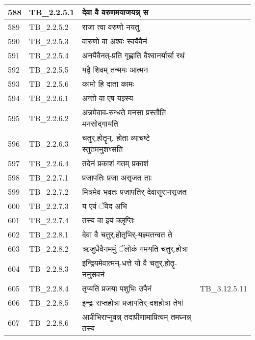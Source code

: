 \documentclass[17pt]{extarticle}
\begin{document}
\begin{longtable}{||p{0.4in}||p{0.9in}||p{4.0in}||p{0.9in}||}
        \hline
            588 & TB\_2.2.5.1 & देवा वै वरुणमयाजयन्न् स &      \\
        \hline
            589 & TB\_2.2.5.2 & राजा त्वा वरुणो नयतु &      \\
        \hline
            590 & TB\_2.2.5.3 & वारुणो वा अश्वः स्वयैवैनं &      \\
        \hline
            591 & TB\_2.2.5.4 & अनयैवैनत्{-}प्रति गृह्णाति वैश्वानर्यार्चा रथं &      \\
        \hline
            592 & TB\_2.2.5.5 & यद्वै शिवम् तन्मयः आत्मन &      \\
        \hline
            593 & TB\_2.2.5.6 & कामो हि दाता कामः &      \\
        \hline
            594 & TB\_2.2.6.1 & अन्तो वा एष यज्ञ्स्य &      \\
        \hline
            595 & TB\_2.2.6.2 & अन्नमेवाव{-}रुन्धते मनसा प्रस्तौति मनसोद्गायति &      \\
        \hline
            596 & TB\_2.2.6.3 & चतुर्.होतॄन्. होता व्याचष्टे स्तुतमनुशꣳसति &      \\
        \hline
            597 & TB\_2.2.6.4 & तदेनं प्रकाशं गतम् प्रकाशं &      \\
        \hline
            598 & TB\_2.2.7.1 & प्रजापतिः प्रजा असृजत ताः &      \\
        \hline
            599 & TB\_2.2.7.2 & मित्रमेव भवतः प्रजापतिर् देवासुरानसृजत &      \\
        \hline
            600 & TB\_2.2.7.3 & य एवं ॅवेद अभि &      \\
        \hline
            601 & TB\_2.2.7.4 & तस्य वा इयं क्लृप्तिः &      \\
        \hline
            602 & TB\_2.2.8.1 & देवा वै चतुर्.होतृभिर्{-}यज्ञ्मतन्वत ते &      \\
        \hline
            603 & TB\_2.2.8.2 & ऋजुधैवैनममुं ॅलोकं गमयति चतुर्.होत्रा &      \\
        \hline
            604 & TB\_2.2.8.3 & इन्द्रियमेवात्मन्{-}धत्ते यो वै चतुर्.होतॄ{-}ननुसवनं &      \\
        \hline
            605 & TB\_2.2.8.4 & तृप्यति प्रजया पशुभिः उपैनं &  TB\_3.12.5.11       \\
        \hline
            606 & TB\_2.2.8.5 & इन्द्रः सप्तहोत्रा प्रजापतिर्{-}दशहोत्रा तेषां &      \\
        \hline
            607 & TB\_2.2.8.6 & आप्रीभिराप्नुवन्न् तदाप्रीणामाप्रित्वम् तमघ्नन्न् तस्य &      \\

\end{longtable}
\end{document}
